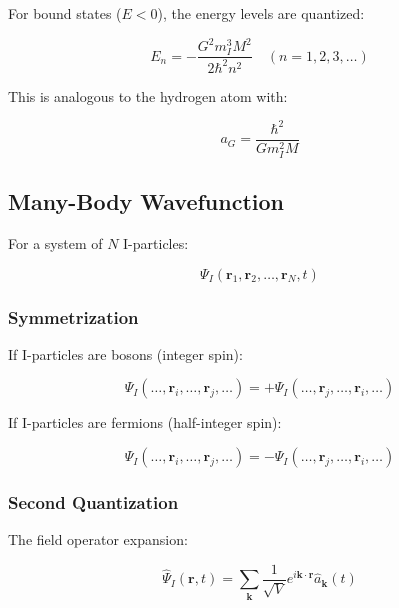 For bound states ($E < 0$), the energy levels are quantized:

\begin{equation}
\label{eq:bound_state_energy}
E_n = -\frac{G^2m_I^3M^2}{2\hbar^2 n^2} \quad (n = 1, 2, 3, \ldots)
\end{equation}

This is analogous to the hydrogen atom with:

\begin{equation}
\label{eq:gravitational_bohr_radius}
a_G = \frac{\hbar^2}{Gm_I^2 M}
\end{equation}

\subsection{Many-Body Wavefunction}

For a system of $N$ I-particles:

\begin{equation}
\label{eq:many_body_wavefunction}
\Psi_I(\mathbf{r}_1, \mathbf{r}_2, \ldots, \mathbf{r}_N, t)
\end{equation}

\subsubsection{Symmetrization}

If I-particles are bosons (integer spin):

\begin{equation}
\label{eq:symmetric_wavefunction}
\Psi_I(\ldots, \mathbf{r}_i, \ldots, \mathbf{r}_j, \ldots) = +\Psi_I(\ldots, \mathbf{r}_j, \ldots, \mathbf{r}_i, \ldots)
\end{equation}

If I-particles are fermions (half-integer spin):

\begin{equation}
\label{eq:antisymmetric_wavefunction}
\Psi_I(\ldots, \mathbf{r}_i, \ldots, \mathbf{r}_j, \ldots) = -\Psi_I(\ldots, \mathbf{r}_j, \ldots, \mathbf{r}_i, \ldots)
\end{equation}

\subsubsection{Second Quantization}

The field operator expansion:

\begin{equation}
\label{eq:field_operator}
\hat{\Psi}_I(\mathbf{r}, t) = \sum_\mathbf{k} \frac{1}{\sqrt{V}} e^{i\mathbf{k}\cdot\mathbf{r}} \hat{a}_\mathbf{k}(t)
\end{equation}

